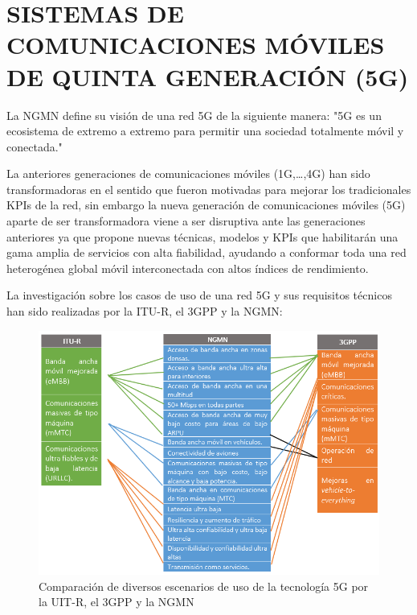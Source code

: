 \section{SISTEMAS DE COMUNICACIONES MÓVILES DE QUINTA GENERACIÓN (5G)}

La NGMN define su visión de una red 5G de la siguiente manera: "5G es un ecosistema de extremo a extremo para permitir una sociedad totalmente móvil y conectada."\newline

La anteriores generaciones de comunicaciones móviles (1G,{\dots},4G) han sido transformadoras en el sentido que fueron motivadas para mejorar los tradicionales KPIs de la red, sin embargo la nueva generación de comunicaciones móviles (5G) aparte de ser transformadora viene a ser disruptiva ante las generaciones anteriores ya que propone nuevas técnicas, modelos y KPIs que habilitarán una gama amplia de servicios con alta fiabilidad, ayudando a conformar toda una red heterogénea global móvil interconectada con altos índices de rendimiento.\newline

La investigación sobre los casos de uso de una red 5G y sus requisitos técnicos han sido realizadas por la ITU-R, el 3GPP y la NGMN:

\begin{figure}[th]
\centering
\includegraphics[scale=1]{Figures/Comparación de diversos escenarios de uso de la tecnología 5G}
\decoRule
\caption[Comparación de diversos escenarios de uso de la tecnología 5G por la UIT-R, el 3GPP y la NGMN]{Comparación de diversos escenarios de uso de la tecnología 5G por la UIT-R, el 3GPP y la NGMN}
\label{fig:5g}
\end{figure}

